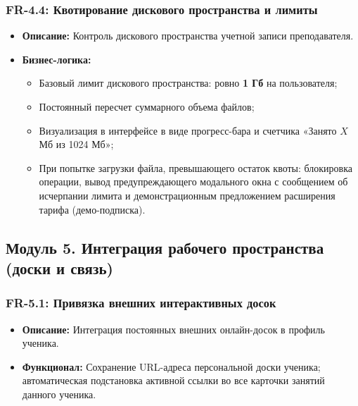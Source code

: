 \documentclass[12pt,a4paper]{article}
\begin{document}
\subsubsection*{FR-4.4: Квотирование дискового пространства и лимиты}
\begin{itemize}
    \item \textbf{Описание:} Контроль дискового пространства учетной записи преподавателя.
    \item \textbf{Бизнес-логика:}
          \begin{itemize}[label=---]
              \item Базовый лимит дискового пространства: ровно \textbf{1 Гб} на пользователя;
              \item Постоянный пересчет суммарного объема файлов;
              \item Визуализация в интерфейсе в виде прогресс-бара и счетчика «Занято $X$ Мб из 1024 Мб»;
              \item При попытке загрузки файла, превышающего остаток квоты: блокировка операции, вывод предупреждающего модального окна с сообщением об исчерпании лимита и демонстрационным предложением расширения тарифа (демо-подписка).
          \end{itemize}
\end{itemize}

\subsection{Модуль 5. Интеграция рабочего пространства (доски и связь)}

\subsubsection*{FR-5.1: Привязка внешних интерактивных досок}
\begin{itemize}
    \item \textbf{Описание:} Интеграция постоянных внешних онлайн-досок в профиль ученика.
    \item \textbf{Функционал:} Сохранение URL-адреса персональной доски ученика; автоматическая подстановка активной ссылки во все карточки занятий данного ученика.
\end{itemize}
\end{document}
